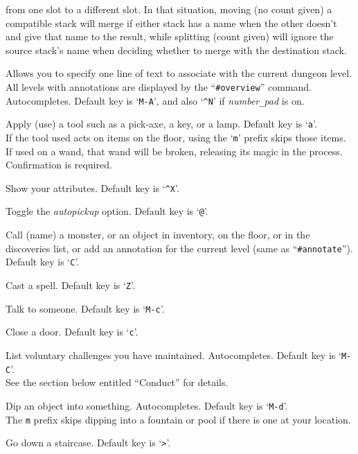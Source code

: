 from one slot to a different slot.  In that situation, moving (no
count given) a compatible stack will merge if either stack has a
name when the other doesn't and give that name to the result, while
splitting (count given) will ignore the source stack's name when
deciding whether to merge with the destination stack.
\item[\tb{\#annotate}]
Allows you to specify one line of text to associate with the current
dungeon level.  All levels with annotations are displayed by the
``{\tt \#overview}'' command. Autocompletes.
Default key is `{\tt M-A}',
and also `{\tt \^{}N}' if {\it number\verb+_+pad\/} is on.
\item[\tb{\#apply}]
Apply (use) a tool such as a pick-axe, a key, or a lamp.
Default key is `{\tt a}'.\\
If the tool used acts on items on the floor, using the `{\tt m}' prefix
skips those items.\\
If used on a wand, that wand will be broken, releasing its magic in the
process.  Confirmation is required.
\item[\tb{\#attributes}]
Show your attributes. Default key is `{\tt \^{}X}'.
\item[\tb{\#autopickup}]
Toggle the {\it autopickup\/} option. Default key is `{\tt @}'.
\item[\tb{\#call}]
Call (name) a monster, or an object in inventory, on the floor,
or in the discoveries list, or add an annotation for the
current level (same as ``{\tt \#annotate}''). Default key is `{\tt C}'.
\item[\tb{\#cast}]
Cast a spell. Default key is `{\tt Z}'.
\item[\tb{\#chat}]
Talk to someone. Default key is `{\tt M-c}'.
\item[\tb{\#close}]
Close a door. Default key is `{\tt c}'.
\item[\tb{\#conduct}]
List voluntary challenges you have maintained. Autocompletes.
Default key is `{\tt M-C}'.\\
See the section below entitled ``Conduct'' for details.
\item[\tb{\#dip}]
Dip an object into something. Autocompletes. Default key is `{\tt M-d}'.\\
The {\tt m} prefix skips dipping into a fountain or pool if there
is one at your location.
\item[\tb{\#down}]
Go down a staircase. Default key is `{\tt >}'.
\item[\tb{\#drop}]
